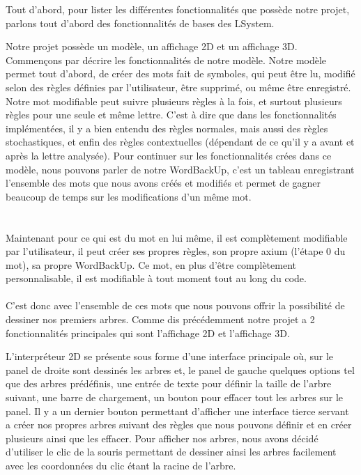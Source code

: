 \documentclass[a4paper,12pt]{article}
\begin{document}
Tout d'abord, pour lister les différentes fonctionnalités que possède notre projet, parlons tout d'abord des fonctionnalités de bases des LSystem.

Notre projet possède un modèle, un affichage 2D et un affichage 3D. Commençons par décrire les fonctionnalités de notre modèle. Notre modèle permet tout d'abord, de créer des mots fait de symboles, qui peut être lu, modifié selon des règles définies par l'utilisateur, être supprimé, ou même être enregistré. Notre mot modifiable peut suivre plusieurs règles à la fois, et surtout plusieurs règles pour une seule et même lettre. C'est à dire que dans les fonctionnalités implémentées, il y a bien entendu des règles normales, mais aussi des règles stochastiques, et enfin des règles contextuelles (dépendant de ce qu'il y a avant et après la lettre analysée). Pour continuer sur les fonctionnalités crées dans ce modèle, nous pouvons parler de notre WordBackUp, c'est un tableau enregistrant l'ensemble des mots que nous avons créés et modifiés et permet de gagner beaucoup de temps sur les modifications d'un même mot. 
\\\\\\
Maintenant pour ce qui est du mot en lui même, il est complètement modifiable par l'utilisateur, il peut créer ses propres règles, son propre axium (l'étape 0 du mot), sa propre WordBackUp. Ce mot, en plus d'être complètement personnalisable, il est modifiable à tout moment tout au long du code.
\\\\
C'est donc avec l'ensemble de ces mots que nous pouvons offrir la possibilité de dessiner nos premiers arbres. Comme dis précédemment notre projet a 2 fonctionnalités principales qui sont l'affichage 2D et l'affichage 3D.

L'interpréteur 2D se présente sous forme d'une interface principale où, sur le panel de droite sont dessinés les arbres et, le panel de gauche quelques options tel que des arbres prédéfinis, une entrée de texte pour définir la taille de l'arbre suivant, une barre de chargement, un bouton pour effacer tout les arbres sur le panel. Il y a un dernier bouton permettant d'afficher une interface tierce servant a créer nos propres arbres suivant des règles que nous pouvons définir et en créer plusieurs ainsi que les effacer. Pour afficher nos arbres, nous avons décidé d'utiliser le clic de la souris permettant de dessiner ainsi les arbres facilement avec les coordonnées du clic étant la racine de l'arbre.     
\end{document}
